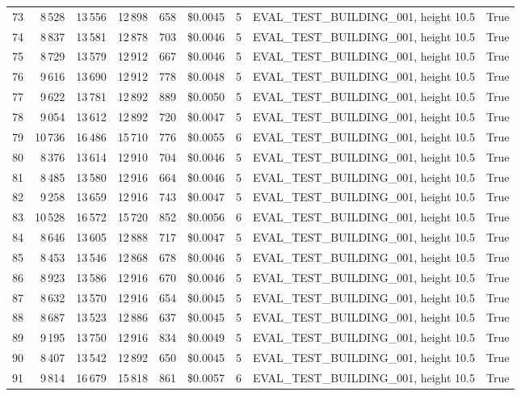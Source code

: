 \documentclass[a4paper,11pt]{article}
\begin{document}
\begin{table}[ht]
\begin{tabular}{r r r r r r r p{3cm} l}
73 & 8\,528 & 13\,556 & 12\,898 & 658 & \$0.0045 & 5 & EVAL\_TEST\_BUILDING\_001, height 10.5 & True \\
74 & 8\,837 & 13\,581 & 12\,878 & 703 & \$0.0046 & 5 & EVAL\_TEST\_BUILDING\_001, height 10.5 & True \\
75 & 8\,729 & 13\,579 & 12\,912 & 667 & \$0.0046 & 5 & EVAL\_TEST\_BUILDING\_001, height 10.5 & True \\
76 & 9\,616 & 13\,690 & 12\,912 & 778 & \$0.0048 & 5 & EVAL\_TEST\_BUILDING\_001, height 10.5 & True \\
77 & 9\,622 & 13\,781 & 12\,892 & 889 & \$0.0050 & 5 & EVAL\_TEST\_BUILDING\_001, height 10.5 & True \\
78 & 9\,054 & 13\,612 & 12\,892 & 720 & \$0.0047 & 5 & EVAL\_TEST\_BUILDING\_001, height 10.5 & True \\
79 & 10\,736 & 16\,486 & 15\,710 & 776 & \$0.0055 & 6 & EVAL\_TEST\_BUILDING\_001, height 10.5 & True \\
80 & 8\,376 & 13\,614 & 12\,910 & 704 & \$0.0046 & 5 & EVAL\_TEST\_BUILDING\_001, height 10.5 & True \\
81 & 8\,485 & 13\,580 & 12\,916 & 664 & \$0.0046 & 5 & EVAL\_TEST\_BUILDING\_001, height 10.5 & True \\
82 & 9\,258 & 13\,659 & 12\,916 & 743 & \$0.0047 & 5 & EVAL\_TEST\_BUILDING\_001, height 10.5 & True \\
83 & 10\,528 & 16\,572 & 15\,720 & 852 & \$0.0056 & 6 & EVAL\_TEST\_BUILDING\_001, height 10.5 & True \\
84 & 8\,646 & 13\,605 & 12\,888 & 717 & \$0.0047 & 5 & EVAL\_TEST\_BUILDING\_001, height 10.5 & True \\
85 & 8\,453 & 13\,546 & 12\,868 & 678 & \$0.0046 & 5 & EVAL\_TEST\_BUILDING\_001, height 10.5 & True \\
86 & 8\,923 & 13\,586 & 12\,916 & 670 & \$0.0046 & 5 & EVAL\_TEST\_BUILDING\_001, height 10.5 & True \\
87 & 8\,632 & 13\,570 & 12\,916 & 654 & \$0.0045 & 5 & EVAL\_TEST\_BUILDING\_001, height 10.5 & True \\
88 & 8\,687 & 13\,523 & 12\,886 & 637 & \$0.0045 & 5 & EVAL\_TEST\_BUILDING\_001, height 10.5 & True \\
89 & 9\,195 & 13\,750 & 12\,916 & 834 & \$0.0049 & 5 & EVAL\_TEST\_BUILDING\_001, height 10.5 & True \\
90 & 8\,407 & 13\,542 & 12\,892 & 650 & \$0.0045 & 5 & EVAL\_TEST\_BUILDING\_001, height 10.5 & True \\
91 & 9\,814 & 16\,679 & 15\,818 & 861 & \$0.0057 & 6 & EVAL\_TEST\_BUILDING\_001, height 10.5 & True \\

\end{tabular}
\end{table}
\end{document}
